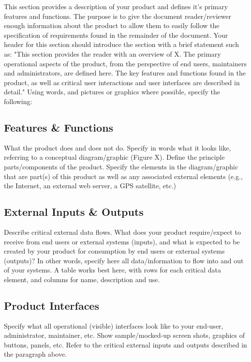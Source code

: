This section provides a description of your product and defines it's primary features and functions. The purpose is to give the document reader/reviewer enough information about the product to allow them to easily follow the specification of requirements found in the remainder of the document. Your header for this section should introduce the section with a brief statement such as: "This section provides the reader with an overview of X. The primary operational aspects of the product, from the perspective of end users, maintainers and administrators, are defined here. The key features and functions found in the product, as well as critical user interactions and user interfaces are described in detail." Using words, and pictures or graphics where possible, specify the following:

\subsection{Features \& Functions}
What the product does and does not do. Specify in words what it looks like, referring to a conceptual diagram/graphic (Figure X).  Define the principle parts/components of the product. Specify the elements in the diagram/graphic that are part(s) of this product as well as any associated external elements (e.g., the Internet, an external web server, a GPS satellite, etc.)

\subsection{External Inputs \& Outputs}
Describe critical external data flows. What does your product require/expect to receive from end users or external systems (inputs), and what is expected to be created by your product for consumption by end users or external systems (outputs)? In other words, specify here all data/information to flow into and out of your systems. A table works best here, with rows for each critical data element, and columns for name, description and use.

\subsection{Product Interfaces}
Specify what all operational (visible) interfaces look like to your end-user, administrator, maintainer, etc. Show sample/mocked-up screen shots, graphics of buttons, panels, etc. Refer to the critical external inputs and outputs described in the paragraph above.
